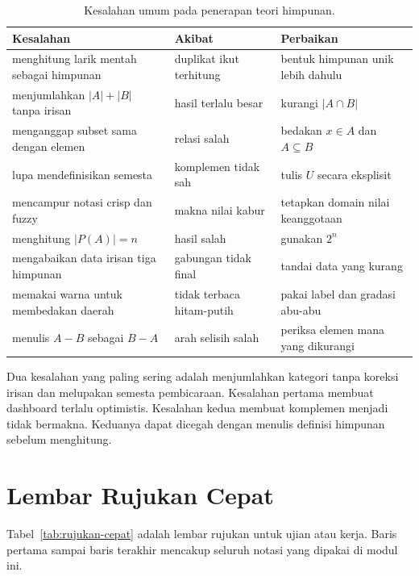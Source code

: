 \documentclass[11pt,a4paper]{article}
\begin{document}
\begin{table}[H]
	\centering
	\caption{Kesalahan umum pada penerapan teori himpunan.}
	\label{tab:kesalahan}
	\footnotesize
	\begin{tabularx}{\textwidth}{l X X}
		\toprule
		Kesalahan & Akibat & Perbaikan \\
		\midrule
		menghitung larik mentah sebagai himpunan & duplikat ikut terhitung & bentuk himpunan unik lebih dahulu \\
		menjumlahkan $|A|+|B|$ tanpa irisan & hasil terlalu besar & kurangi $|A \cap B|$ \\
		menganggap subset sama dengan elemen & relasi salah & bedakan $x \in A$ dan $A \subseteq B$ \\
		lupa mendefinisikan semesta & komplemen tidak sah & tulis $U$ secara eksplisit \\
		mencampur notasi crisp dan fuzzy & makna nilai kabur & tetapkan domain nilai keanggotaan \\
		menghitung $|P(A)|=n$ & hasil salah & gunakan $2^n$ \\
		mengabaikan data irisan tiga himpunan & gabungan tidak final & tandai data yang kurang \\
		memakai warna untuk membedakan daerah & tidak terbaca hitam-putih & pakai label dan gradasi abu-abu \\
		menulis $A-B$ sebagai $B-A$ & arah selisih salah & periksa elemen mana yang dikurangi \\
		\bottomrule
	\end{tabularx}
\end{table}

Dua kesalahan yang paling sering adalah menjumlahkan kategori tanpa koreksi irisan dan melupakan semesta pembicaraan. Kesalahan pertama membuat dashboard terlalu optimistis. Kesalahan kedua membuat komplemen menjadi tidak bermakna. Keduanya dapat dicegah dengan menulis definisi himpunan sebelum menghitung.

\section{Lembar Rujukan Cepat}

Tabel~\ref{tab:rujukan-cepat} adalah lembar rujukan untuk ujian atau kerja. Baris pertama sampai baris terakhir mencakup seluruh notasi yang dipakai di modul ini.
\end{document}
